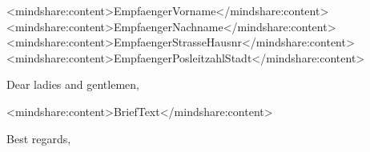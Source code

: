 \documentclass[
fontsize=11pt,
paper=a4,
headsepline,
footsepline,
parskip=false
]{scrlttr2}
\begin{document}
\begin{letter}{%
<mindshare:content>EmpfaengerVorname</mindshare:content><mindshare:content>EmpfaengerNachname</mindshare:content>\\ 
<mindshare:content>EmpfaengerStrasseHausnr</mindshare:content>\\ 
<mindshare:content>EmpfaengerPosleitzahlStadt</mindshare:content>
}

\opening{Dear ladies and gentlemen,}


<mindshare:content>BriefText</mindshare:content>


\closing{Best regards,}






  
\end{letter}
\end{document}
